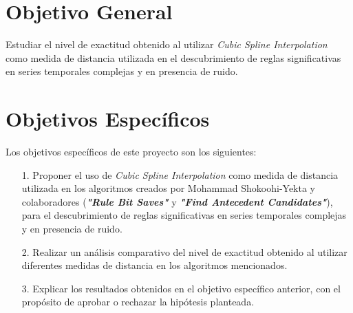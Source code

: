 \section{\textbf{Objetivo General}}
Estudiar el nivel de exactitud obtenido al utilizar \textit{Cubic Spline Interpolation} como medida de distancia utilizada en el descubrimiento de reglas significativas en series temporales complejas y en presencia de ruido.
\section{\textbf{Objetivos Espec\'ificos}}
Los objetivos espec\'ificos de este proyecto son los siguientes:
\begin{itemize}
\item [1.] Proponer el uso de \textit{Cubic Spline Interpolation} como medida de distancia utilizada en los algoritmos creados por Mohammad Shokoohi-Yekta y colaboradores (\textit{\textbf{"Rule Bit Saves"}} y \textit{\textbf{"Find Antecedent Candidates"}}), para el descubrimiento de reglas significativas en series temporales complejas y en presencia de ruido.
	\item [2.] Realizar un an\'alisis comparativo del nivel de exactitud obtenido al utilizar diferentes medidas de distancia en los algoritmos mencionados.
\item [3.] Explicar los resultados obtenidos en el objetivo espec\'ifico anterior, con el prop\'osito de aprobar o rechazar la hip\'otesis planteada.
\end{itemize}